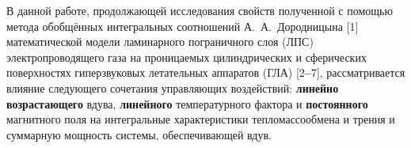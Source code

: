 \vzmscaption



     В  данной  работе,
продолжающей  исследования  свойств
полученной
с  помощью  метода
обобщённых  интегральных  соотношений
А.~А.~Дородницына
[1]
математической  модели
ламинарного  пограничного  слоя
(ЛПС)
электропроводящего  газа
на  проницаемых  цилиндрических
и  сферических  поверхностях
гиперзвуковых  летательных  аппаратов
(ГЛА)
[2{\textbf{--}}7],
рассматривается  влияние
следующего  сочетания
управляющих  воздействий:
\textbf{линейно  возрастающего}
вдува,
\textbf{линейного}
температурного  фактора
и
\textbf{постоянного}
магнитного  поля
на
интегральные
характеристики
тепломассообмена  и  трения
и
суммарную  мощность
системы,
обеспечивающей  вдув.



